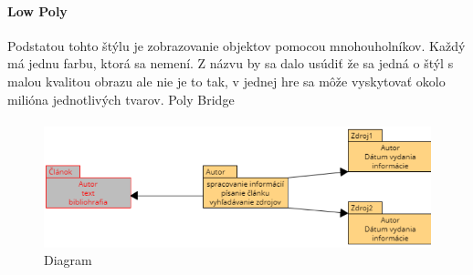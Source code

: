\documentclass[10pt,twoside,slovak,a4paper]{article}
\begin{document}
\paragraph{Low Poly}
Podstatou tohto štýlu je zobrazovanie objektov pomocou mnohouholníkov. Každý má jednu farbu, ktorá sa nemení. Z názvu by sa dalo usúdiť že sa jedná o štýl s malou kvalitou obrazu ale nie je to tak, v jednej hre sa môže vyskytovať okolo milióna jednotlivých tvarov.
Poly Bridge

\paragraph{}
\begin{figure}
\begin{center}
\includegraphics[width=12cm]{diagram novy.png}
\caption{Diagram}
\end{center}
\end{figure}




























\end{document}
